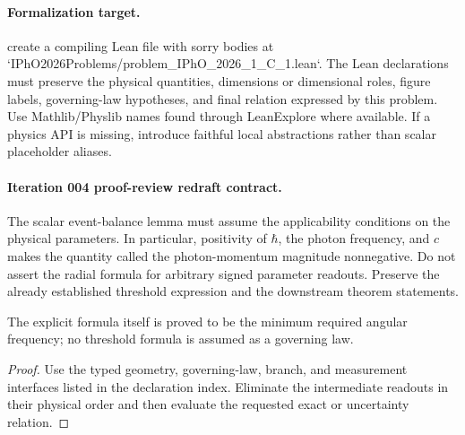 \paragraph{Formalization target.}
create a compiling Lean file with sorry bodies at `IPhO2026Problems/problem\_IPhO\_2026\_1\_C\_1.lean`. The Lean declarations must preserve the physical quantities, dimensions or dimensional roles, figure labels, governing-law hypotheses, and final relation expressed by this problem.
Use Mathlib/Physlib names found through LeanExplore where available. If a physics API is missing, introduce faithful local abstractions rather than scalar placeholder aliases.

\paragraph{Iteration 004 proof-review redraft contract.}
The scalar event-balance lemma must assume the applicability conditions on the
physical parameters.  In particular, positivity of \(\hbar\), the photon
frequency, and \(c\) makes the quantity called the photon-momentum magnitude
nonnegative.  Do not assert the radial formula for arbitrary signed parameter
readouts.  Preserve the already established threshold expression and the
downstream theorem statements.

\begin{theorem}
  \label{thm:physics:IPhO_2026_1_C_1:target}
  The explicit formula itself is proved to be the minimum required angular
  frequency; no threshold formula is assumed as a governing law.
\end{theorem}
\begin{proof}
  Use the typed geometry, governing-law, branch, and measurement interfaces listed in the declaration index.  Eliminate the intermediate readouts in their physical order and then evaluate the requested exact or uncertainty relation.
\end{proof}
